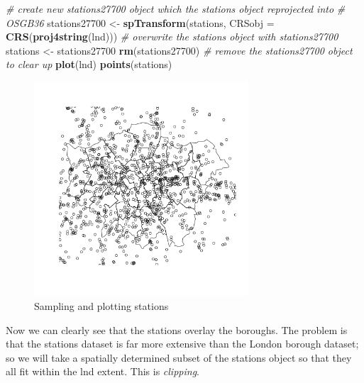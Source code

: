 \documentclass[]{article}
\newenvironment{Shaded}{}{}
\newcommand{\KeywordTok}[1]{\textcolor[rgb]{0.00,0.44,0.13}{\textbf{{#1}}}}
\newcommand{\DataTypeTok}[1]{\textcolor[rgb]{0.56,0.13,0.00}{{#1}}}
\newcommand{\CommentTok}[1]{\textcolor[rgb]{0.38,0.63,0.69}{\textit{{#1}}}}
\newcommand{\NormalTok}[1]{{#1}}
\let\Oldincludegraphics\includegraphics
\renewcommand{\includegraphics}[1]{\Oldincludegraphics[width=8cm]{#1}}
\begin{document}
\begin{Shaded}
\begin{Highlighting}[]
\CommentTok{# create new stations27700 object which the stations object reprojected into}
\CommentTok{# OSGB36}
\NormalTok{stations27700 <- }\KeywordTok{spTransform}\NormalTok{(stations, }\DataTypeTok{CRSobj =} \KeywordTok{CRS}\NormalTok{(}\KeywordTok{proj4string}\NormalTok{(lnd)))}
\CommentTok{# overwrite the stations object with stations27700}
\NormalTok{stations <- stations27700}
\KeywordTok{rm}\NormalTok{(stations27700)  }\CommentTok{# remove the stations27700 object to clear up}
\KeywordTok{plot}\NormalTok{(lnd)}
\KeywordTok{points}\NormalTok{(stations)}
\end{Highlighting}
\end{Shaded}
\begin{figure}[htbp]
\centering
\includegraphics{figure/Sampling_and_plotting_stations.png}
\caption{Sampling and plotting stations}
\end{figure}

Now we can clearly see that the stations overlay the boroughs. The
problem is that the stations dataset is far more extensive than the
London borough dataset; so we will take a spatially determined subset of
the stations object so that they all fit within the lnd extent. This is
\emph{clipping}.
\end{document}

